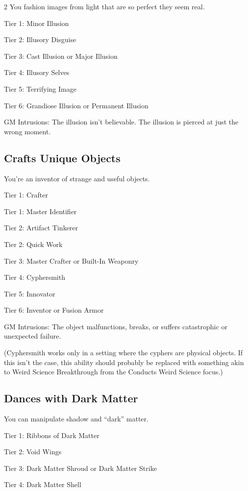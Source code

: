 \begin{multicols}{2}
You fashion images from light that are so perfect they seem real.

Tier 1: Minor Illusion

Tier 2: Illusory Disguise

Tier 3: Cast Illusion or Major Illusion

Tier 4: Illusory Selves

Tier 5: Terrifying Image

Tier 6: Grandiose Illusion or Permanent Illusion

GM Intrusions: The illusion isn’t believable. The illusion is pierced at just the wrong moment.

\subsection{Crafts Unique Objects}

You’re an inventor of strange and useful objects.

Tier 1: Crafter

Tier 1: Master Identifier

Tier 2: Artifact Tinkerer

Tier 2: Quick Work

Tier 3: Master Crafter or Built-In Weaponry

Tier 4: Cyphersmith

Tier 5: Innovator

Tier 6: Inventor or Fusion Armor 

GM Intrusions: The object malfunctions, breaks, or suffers catastrophic or unexpected failure.

(Cyphersmith works only in a setting where the cyphers are physical objects. If this isn’t the case, this ability should probably be replaced with something akin to Weird Science Breakthrough from the Conducts Weird Science focus.)

\subsection{Dances with Dark Matter}

You can manipulate shadow and “dark” matter.

Tier 1: Ribbons of Dark Matter

Tier 2: Void Wings

Tier 3: Dark Matter Shroud or Dark Matter Strike

Tier 4: Dark Matter Shell


\end{multicols}
